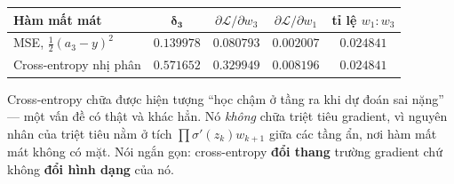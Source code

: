 \begin{table}[H]
\centering
\begin{captionaboveboxaivn}
\end{captionaboveboxaivn}
\renewcommand{\arraystretch}{1.2}
\begin{tabular}{@{}lcccc@{}}
\toprule
\rowcolor{rowLavender}
\textbf{Hàm mất mát} & $\boldsymbol{\delta_3}$ &
$\partial\mathcal{L}/\partial w_3$ & $\partial\mathcal{L}/\partial w_1$ &
\textbf{tỉ lệ $w_1\!:\!w_3$} \\
\midrule
MSE, $\tfrac12(a_3-y)^2$ & $0.139978$ & $0.080793$ & $0.002007$ & $0.024841$ \\
\addlinespace[2pt]
Cross-entropy nhị phân   & $0.571652$ & $0.329949$ & $0.008196$ & $0.024841$ \\
\bottomrule
\end{tabular}
\end{table}

\begin{notebox}
Cross-entropy chữa được hiện tượng ``học chậm ở tầng ra khi dự đoán sai nặng'' ---
một vấn đề có thật và khác hẳn. Nó \emph{không} chữa triệt tiêu gradient, vì
nguyên nhân của triệt tiêu nằm ở tích $\prod\sigma'(z_k)w_{k+1}$ giữa các tầng
ẩn, nơi hàm mất mát không có mặt. Nói ngắn gọn: cross-entropy \textbf{đổi thang}
trường gradient chứ không \textbf{đổi hình dạng} của nó.
\end{notebox}
